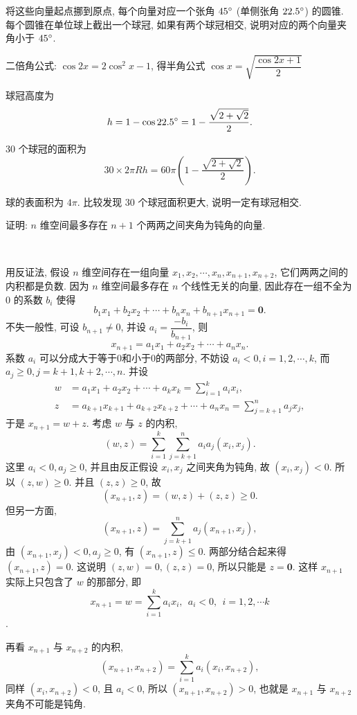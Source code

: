 将这些向量起点挪到原点, 每个向量对应一个张角 $ 45 \degree $ (单侧张角 $ 22.5 \degree $) 的圆锥. 每个圆锥在单位球上截出一个球冠, 如果有两个球冠相交, 说明对应的两个向量夹角小于 $ 45 \degree $.

二倍角公式: $ \cos 2x = 2 \cos^2 x - 1 $, 得半角公式 $ \cos x = \sqrt{ \dfrac{\cos 2x+1}{2} } $

球冠高度为 \[ h = 1 - \cos 22.5\degree = 1 - \frac{\sqrt{2+\sqrt{2}}}{2} .\]

30 个球冠的面积为 \[ 30\times 2\pi Rh = 60\pi \left( 1 - \frac{\sqrt{2+\sqrt{2}}}{2} \right).\]

球的表面积为 $ 4\pi $. 比较发现 30 个球冠面积更大, 说明一定有球冠相交.


\newpage
证明: $n$ 维空间最多存在 $n+1$ 个两两之间夹角为钝角的向量.

~

用反证法, 假设 $n$ 维空间存在一组向量 $x_1,x_2,\cdots,x_n,x_{n+1},x_{n+2}$, 它们两两之间的内积都是负数. 因为 $n$ 维空间最多存在 $n$ 个线性无关的向量, 因此存在一组不全为 0 的系数 $b_i$ 使得
\[b_1x_1 + b_2x_2 + \cdots + b_nx_n + b_{n+1}x_{n+1}=\mathbf{0}.\]
不失一般性, 可设 $b_{n+1}\neq 0$, 并设 $a_i = \dfrac{-b_i}{b_{n+1}}$, 则
\[ x_{n+1} = a_1x_1+a_2x_2 + \cdots + a_nx_n .\]
系数 $a_i$ 可以分成大于等于0和小于0的两部分, 不妨设 $a_i < 0, i=1,2,\cdots,k$, 而 $a_j \ge 0, j=k+1,k+2,\cdots,n$. 并设
\begin{align*}
w &= a_1x_1+a_2x_2+\cdots+a_kx_k = \sum_{i=1}^ka_ix_i, \\ 
z &= a_{k+1}x_{k+1}+a_{k+2}x_{k+2}+\cdots+a_nx_n = \sum_{j=k+1}^na_jx_j,
\end{align*}
于是 $x_{n+1} = w + z$. 考虑 $w$ 与 $z$ 的内积, 
\[(w,z) = \sum_{i=1}^k\sum_{j=k+1}^na_ia_j(x_i,x_j) .\]
这里 $a_i<0, a_j \ge 0$, 并且由反正假设 $x_i,x_j$ 之间夹角为钝角, 故 $(x_i,x_j) < 0$. 所以 $(z,w) \ge 0$. 并且 $(z,z) \ge 0$, 故
\[(x_{n+1},z) = (w,z) + (z,z) \ge 0 .\]
但另一方面, 
\[(x_{n+1},z) = \sum_{j=k+1}^na_j(x_{n+1},x_j) ,\]
由 $(x_{n+1},x_j) < 0, a_j \ge 0$, 有 $(x_{n+1},z) \le 0$. 两部分结合起来得 $(x_{n+1},z) = 0$. 这说明 $(z,w) = 0, (z,z) = 0$, 所以只能是 $z = \mathbf{0}$. 这样 $x_{n+1}$ 实际上只包含了 $w$ 的那部分, 即 
$$x_{n+1} = w = \sum_{i=1}^ka_ix_i, \ \ a_i < 0, \ \ i=1,2,\cdots k$$.

再看 $x_{n+1}$ 与 $x_{n+2}$ 的内积, 
\[(x_{n+1},x_{n+2}) = \sum_{i=1}^ka_i(x_i,x_{n+2}) ,\]
同样 $(x_i,x_{n+2}) < 0$, 且 $a_i < 0$, 所以 $(x_{n+1},x_{n+2}) > 0$, 也就是 $x_{n+1}$ 与 $x_{n+2}$ 夹角不可能是钝角.

